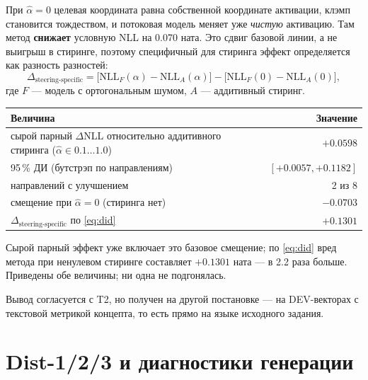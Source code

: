 \documentclass[10pt,a4paper]{article}
\newcommand{\ahat}{\hat{\alpha}}
\begin{document}
При $\ahat = 0$ целевая координата равна собственной координате активации, клэмп
становится тождеством, и потоковая модель меняет уже \emph{чистую} активацию. Там метод
\textbf{снижает} условную NLL на 0.070 ната. Это сдвиг базовой линии, а не
выигрыш в стиринге, поэтому специфичный для стиринга эффект определяется как
разность разностей:
\begin{equation}
  \Delta_{\text{steering-specific}}
  = \bigl[\mathrm{NLL}_F(\alpha) - \mathrm{NLL}_A(\alpha)\bigr]
  - \bigl[\mathrm{NLL}_F(0) - \mathrm{NLL}_A(0)\bigr],
  \label{eq:did}
\end{equation}
где $F$ — модель с ортогональным шумом, $A$ — аддитивный стиринг.

\begin{center}\small
\begin{tabular}{@{}lr@{}}
\toprule
Величина & Значение\\
\midrule
сырой парный $\Delta$NLL относительно аддитивного стиринга ($\ahat \in 0.1\ldots1.0$) & $\mathbf{+0.0598}$\\
95\,\% ДИ (бутстрэп по направлениям) & $[+0.0057, +0.1182]$\\
направлений с улучшением & 2 из 8\\
смещение при $\ahat = 0$ (стиринга нет) & $\mathbf{-0.0703}$\\
$\Delta_{\text{steering-specific}}$ по \eqref{eq:did} & $\mathbf{+0.1301}$\\
\bottomrule
\end{tabular}
\end{center}

\medskip
Сырой парный эффект уже включает это базовое смещение; по \eqref{eq:did} вред метода при
ненулевом стиринге составляет $+0.1301$ ната — в 2.2 раза больше. Приведены обе
величины; ни одна не подгонялась.

Вывод согласуется с T2, но получен на другой постановке — на DEV-векторах с
текстовой метрикой концепта, то есть прямо на языке исходного задания.

\section{Dist-1/2/3 и диагностики генерации}
\end{document}
